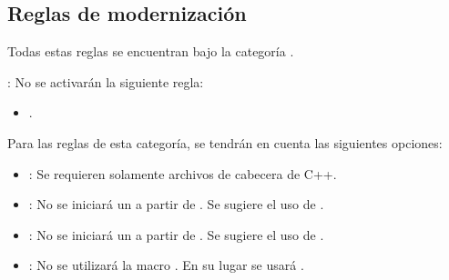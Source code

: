 \subsection{Reglas de modernización}

Todas estas reglas se encuentran bajo la categoría .

: No se activarán la siguiente regla:
\begin{itemize}

\item {}.

\end{itemize}

Para las reglas de esta categoría, se tendrán en cuenta las siguientes
opciones:

\begin{itemize}

\item {}:
Se requieren solamente archivos de cabecera de C++.

\item {}:
No se iniciará un  a partir de .
Se sugiere el uso de .

\item {}:
No se iniciará un  a partir de .
Se sugiere el uso de .

\item {}:
No se utilizará la macro .
En su lugar se usará .


\end{itemize}
